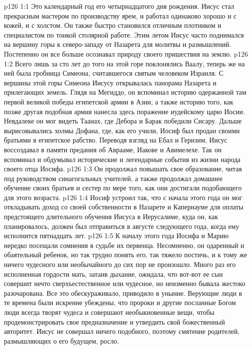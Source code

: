 \vs p126 1:1 Это календарный год его четырнадцатого дня рождения. Иисус стал прекрасным мастером по производству ярем, и работал одинаково хорошо и с кожей, и с холстом. Он также быстро становился отличным плотником и специалистом по тонкой столярной работе. Этим летом Иисус часто поднимался на вершину горы к северо\hyp{}западу от Назарета для молитвы и размышлений. Постепенно он все больше осознавал природу своего пришествия на землю.
\vs p126 1:2 Всего лишь за сто лет до того на этой горе поклонялись Ваалу, теперь же на ней была гробница Симеона, считавшегося святым человеком Израиля. С вершины этой горы Симеона Иисусу открывалась панорама Назарета и прилегающих земель. Глядя на Мегиддо, он вспоминал историю одержанной там первой великой победы египетской армии в Азии, а также историю того, как позже другая подобная армия нанесла здесь поражение иудейскому царю Иосии. Невдалеке он мог видеть Таанах, где Дебора и Барак победили Сисару. Дальше вырисовывались холмы Дофана, где, как его учили, Иосиф был продан своими братьями в египетское рабство. Переводя взгляд на Ебал и Геризим, Иисус воссоздавал в памяти предания об Аврааме, Иакове и Авимелехе. Так он вспоминал и обдумывал исторические и легендарные события из жизни народа своего отца Иосифа.
\vs p126 1:3 Он продолжал повышать свое образование, читая под руководством синагогальных учителей, а также продолжал домашнее обучение своих братьев и сестер по мере того, как они достигали подобающего для этого возраста.
\vs p126 1:4 Иосиф устроил так, что с начала этого года он мог откладывать доход со своей собственности в Назарете и Капернауме для оплаты предстоящего длительного обучения Иисуса в Иерусалиме, куда он, как планировалось, должен был отправиться в августе следующего года, когда ему исполнится пятнадцать лет.
\vs p126 1:5 К началу этого года Иосифа и Марию нередко посещали сомнения в судьбе их первенца. Несомненно, он одаренный и обаятельный ребенок, но так трудно понять его, так тяжело постичь, и к тому же ничего чудесного или необычайного до сих пор не произошло. Много раз его исполненная гордости мать, затаив дыхание, ожидала, что вот\hyp{}вот ее сын совершит нечто сверхъестественное или чудесное, но неизменно бывала жестоко разочарована. Все это обескураживало, приводило в уныние. Верующие люди в те времена были искренне убеждены, что пророки и другие посланные Богом люди всегда творят чудеса и совершают необыкновенные вещи, чтобы продемонстрировать свое предназначение и утвердить свой божественный авторитет. Иисус не совершал ничего подобного, поэтому смятение родителей, размышляющих о его будущем, росло.
